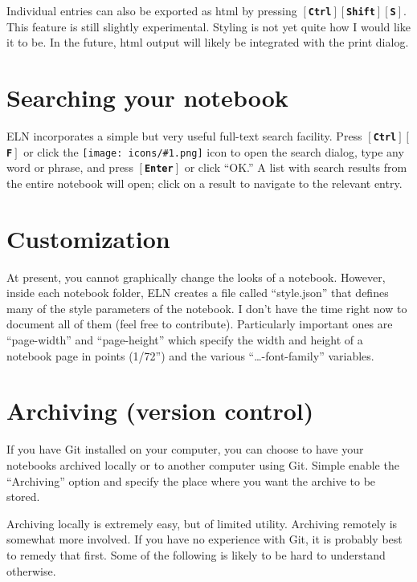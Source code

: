 \documentclass[11pt]{report}
\def\keystroke#1{$\left[\right.\!${\tt\bfseries #1}$\!\left.\right]$}
\def\key#1{\keystroke{#1}}
\def\keycombo#1#2{\keystroke{#1}\keystroke{#2}}
\def\keycontrol#1{\keycombo{Ctrl}{#1}}
\def\controlshift#1{\keystroke{Ctrl}\keystroke{Shift}\keystroke{#1}}
\def\icon#1{\raise-2pt\hbox{\texttt{[image: icons/\#1.png]}}}
\begin{document}
Individual entries can also be exported as html by pressing
\controlshift{S}. This feature is still slightly experimental. Styling
is not yet quite how I would like it to be. In the future, html output
will likely be integrated with the print dialog. 

\section{Searching your notebook}

ELN incorporates a simple but very useful full-text search
facility. Press \keycontrol{F} or click the \icon{nav-find} icon to open the
search dialog, type any word or phrase, and press \key{Enter} or click
``OK.'' A list with search results from the entire notebook will open;
click on a result to navigate to the relevant entry.

\section{Customization}

At present, you cannot graphically change the looks of a
notebook. However, inside each notebook folder, ELN creates a file
called ``style.json'' that defines many of the style parameters of the
notebook. I don't have the time right now to document all of them
(feel free to contribute). Particularly important ones are
``page-width'' and ``page-height'' which specify the width and height
of a notebook page in points (1/72'') and the various
``\ldots-font-family'' variables.

\section{Archiving (version control)}

If you have Git installed on your computer, you can choose to have
your notebooks archived locally or to another computer using
Git. Simple enable the ``Archiving'' option and specify the place
where you want the archive to be stored.

Archiving locally is extremely easy, but of limited utility. Archiving
remotely is somewhat more involved. If you have no experience with
Git, it is probably best to remedy that first. Some of the following
is likely to be hard to understand otherwise.
\end{document}
